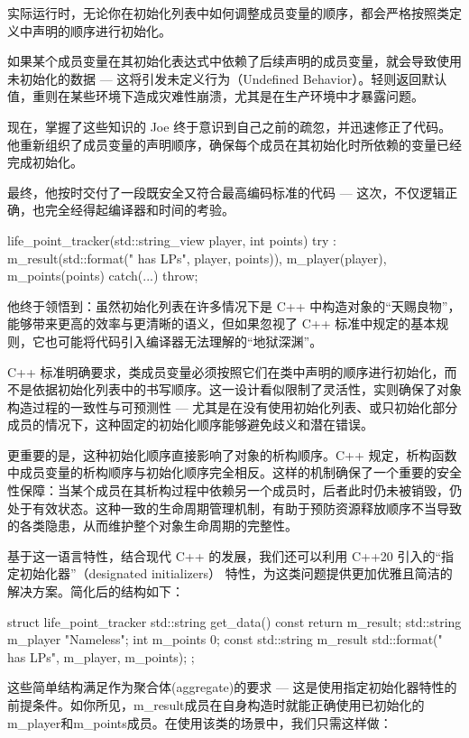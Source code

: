 实际运行时，无论你在初始化列表中如何调整成员变量的顺序，都会严格按照类定义中声明的顺序进行初始化。

如果某个成员变量在其初始化表达式中依赖了后续声明的成员变量，就会导致使用未初始化的数据 --- 这将引发未定义行为（Undefined Behavior）。轻则返回默认值，重则在某些环境下造成灾难性崩溃，尤其是在生产环境中才暴露问题。

现在，掌握了这些知识的 Joe 终于意识到自己之前的疏忽，并迅速修正了代码。他重新组织了成员变量的声明顺序，确保每个成员在其初始化时所依赖的变量已经完成初始化。

最终，他按时交付了一段既安全又符合最高编码标准的代码 --- 这次，不仅逻辑正确，也完全经得起编译器和时间的考验。

\begin{cpp}
life_point_tracker(std::string_view player, int points)
try :
  m_result(std::format("{} has {} LPs", player, points)),
  m_player(player),
  m_points(points)
{ 
}
catch(...) {throw;}
\end{cpp}

他终于领悟到：虽然初始化列表在许多情况下是 C++ 中构造对象的“天赐良物”，能够带来更高的效率与更清晰的语义，但如果忽视了 C++ 标准中规定的基本规则，它也可能将代码引入编译器无法理解的“地狱深渊”。

C++ 标准明确要求，类成员变量必须按照它们在类中声明的顺序进行初始化，而不是依据初始化列表中的书写顺序。这一设计看似限制了灵活性，实则确保了对象构造过程的一致性与可预测性 --- 尤其是在没有使用初始化列表、或只初始化部分成员的情况下，这种固定的初始化顺序能够避免歧义和潜在错误。

更重要的是，这种初始化顺序直接影响了对象的析构顺序。C++ 规定，析构函数中成员变量的析构顺序与初始化顺序完全相反。这样的机制确保了一个重要的安全性保障：当某个成员在其析构过程中依赖另一个成员时，后者此时仍未被销毁，仍处于有效状态。这种一致的生命周期管理机制，有助于预防资源释放顺序不当导致的各类隐患，从而维护整个对象生命周期的完整性。

基于这一语言特性，结合现代 C++ 的发展，我们还可以利用 C++20 引入的“指定初始化器”（designated initializers） 特性，为这类问题提供更加优雅且简洁的解决方案。简化后的结构如下：

\begin{cpp}
struct life_point_tracker {
  std::string get_data() const {
  return m_result;
  }
  std::string m_player {"Nameless"};
  int m_points {0};
  const std::string m_result
    {std::format("{} has {} LPs", m_player, m_points)};
};
\end{cpp}

这些简单结构满足作为聚合体(aggregate)的要求 --- 这是使用指定初始化器特性的前提条件。如你所见，m\_result成员在自身构造时就能正确使用已初始化的m\_player和m\_points成员。在使用该类的场景中，我们只需这样做：

